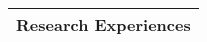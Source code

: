 \Large
\begin{tabularx}{\linewidth}{@{}l}
    Research Experiences \\
    \hline
\end{tabularx}
\normalsize